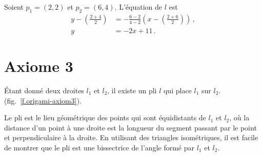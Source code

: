 \begin{example}
Soient $p_1=(2,2)$ et $p_2=(6,4)$. L'équation de $l$ est 
\begin{align*}
y-\left(\frac{2+4}{2}\right)&=-\frac{6-2}{4-2}\left(x-\left(\frac{2+6}{2}\right)\right)\,,\\
y&=-2x+11\,.
\end{align*}
\end{example}



\section{Axiome 3}\label{s.ax3}


\begin{axiom}
Étant donné deux droites $l_1$ et $l_2$, il existe un pli $l$ qui place $l_1$ sur $l_2$. (fig.~\ref{f.origami-axiom3}).
\end{axiom}

Le pli est le lieu géométrique des points qui sont équidistants de $l_1$ et $l_2$, où la distance d'un point à une droite est la longueur du segment passant par le point et perpendiculaire à la droite. En utilisant des triangles isométriques, il est facile de montrer que le pli est une bissectrice de l'angle formé par $l_1$ et $l_2$.

